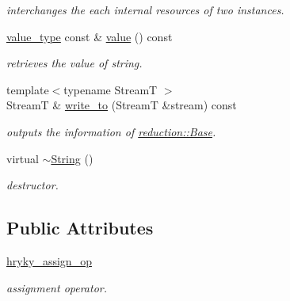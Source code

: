\begin{DoxyCompactItemize}
\begin{DoxyCompactList}\small\item\em interchanges the each internal resources of two instances. \end{DoxyCompactList}\item 
\hypertarget{classhryky_1_1reduction_1_1_string_a34e0856d63ec32786de19999a4ac1ce1}{\hyperlink{classhryky_1_1_string}{value\-\_\-type} const \& \hyperlink{classhryky_1_1reduction_1_1_string_a34e0856d63ec32786de19999a4ac1ce1}{value} () const }\label{classhryky_1_1reduction_1_1_string_a34e0856d63ec32786de19999a4ac1ce1}

\begin{DoxyCompactList}\small\item\em retrieves the value of string. \end{DoxyCompactList}\item 
\hypertarget{classhryky_1_1reduction_1_1_base_a709cc7c48e1c90fe253739e46d82aa19}{{\footnotesize template$<$typename Stream\-T $>$ }\\Stream\-T \& \hyperlink{classhryky_1_1reduction_1_1_base_a709cc7c48e1c90fe253739e46d82aa19}{write\-\_\-to} (Stream\-T \&stream) const }\label{classhryky_1_1reduction_1_1_base_a709cc7c48e1c90fe253739e46d82aa19}

\begin{DoxyCompactList}\small\item\em outputs the information of \hyperlink{classhryky_1_1reduction_1_1_base}{reduction\-::\-Base}. \end{DoxyCompactList}\item 
\hypertarget{classhryky_1_1reduction_1_1_string_adfe4e3c847637aab8aedf3b32b448b14}{virtual \hyperlink{classhryky_1_1reduction_1_1_string_adfe4e3c847637aab8aedf3b32b448b14}{$\sim$\-String} ()}\label{classhryky_1_1reduction_1_1_string_adfe4e3c847637aab8aedf3b32b448b14}

\begin{DoxyCompactList}\small\item\em destructor. \end{DoxyCompactList}\end{DoxyCompactItemize}
\subsection*{Public Attributes}
\begin{DoxyCompactItemize}
\item 
\hypertarget{classhryky_1_1reduction_1_1_string_a767fceb32eff2f18c41f49a9e8d9bc8d}{\hyperlink{classhryky_1_1reduction_1_1_string_a767fceb32eff2f18c41f49a9e8d9bc8d}{hryky\-\_\-assign\-\_\-op}}\label{classhryky_1_1reduction_1_1_string_a767fceb32eff2f18c41f49a9e8d9bc8d}

\begin{DoxyCompactList}\small\item\em assignment operator. \end{DoxyCompactList}\end{DoxyCompactItemize}
